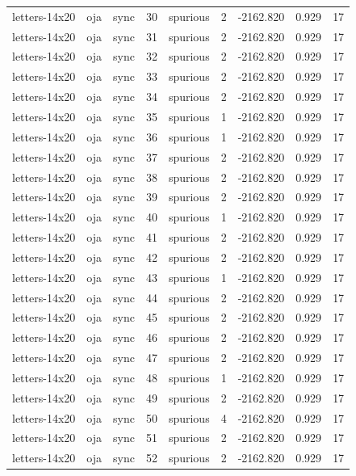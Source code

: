 \begin{tabular}{lllrlrrrr}
letters-14x20 & oja & sync & 30 & spurious & 2 & -2162.820 & 0.929 & 17 \\
letters-14x20 & oja & sync & 31 & spurious & 2 & -2162.820 & 0.929 & 17 \\
letters-14x20 & oja & sync & 32 & spurious & 2 & -2162.820 & 0.929 & 17 \\
letters-14x20 & oja & sync & 33 & spurious & 2 & -2162.820 & 0.929 & 17 \\
letters-14x20 & oja & sync & 34 & spurious & 2 & -2162.820 & 0.929 & 17 \\
letters-14x20 & oja & sync & 35 & spurious & 1 & -2162.820 & 0.929 & 17 \\
letters-14x20 & oja & sync & 36 & spurious & 1 & -2162.820 & 0.929 & 17 \\
letters-14x20 & oja & sync & 37 & spurious & 2 & -2162.820 & 0.929 & 17 \\
letters-14x20 & oja & sync & 38 & spurious & 2 & -2162.820 & 0.929 & 17 \\
letters-14x20 & oja & sync & 39 & spurious & 2 & -2162.820 & 0.929 & 17 \\
letters-14x20 & oja & sync & 40 & spurious & 1 & -2162.820 & 0.929 & 17 \\
letters-14x20 & oja & sync & 41 & spurious & 2 & -2162.820 & 0.929 & 17 \\
letters-14x20 & oja & sync & 42 & spurious & 2 & -2162.820 & 0.929 & 17 \\
letters-14x20 & oja & sync & 43 & spurious & 1 & -2162.820 & 0.929 & 17 \\
letters-14x20 & oja & sync & 44 & spurious & 2 & -2162.820 & 0.929 & 17 \\
letters-14x20 & oja & sync & 45 & spurious & 2 & -2162.820 & 0.929 & 17 \\
letters-14x20 & oja & sync & 46 & spurious & 2 & -2162.820 & 0.929 & 17 \\
letters-14x20 & oja & sync & 47 & spurious & 2 & -2162.820 & 0.929 & 17 \\
letters-14x20 & oja & sync & 48 & spurious & 1 & -2162.820 & 0.929 & 17 \\
letters-14x20 & oja & sync & 49 & spurious & 2 & -2162.820 & 0.929 & 17 \\
letters-14x20 & oja & sync & 50 & spurious & 4 & -2162.820 & 0.929 & 17 \\
letters-14x20 & oja & sync & 51 & spurious & 2 & -2162.820 & 0.929 & 17 \\
letters-14x20 & oja & sync & 52 & spurious & 2 & -2162.820 & 0.929 & 17 \\

\end{tabular}
